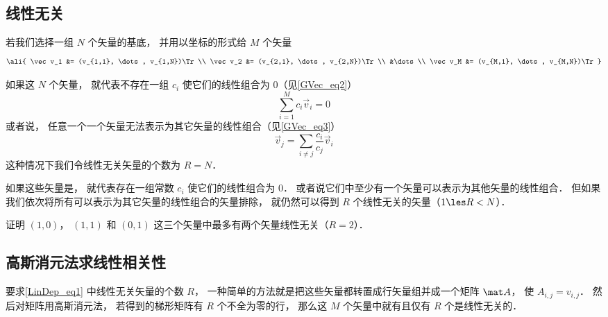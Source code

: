 

\subsection{线性无关}

若我们选择一组 $N$ 个矢量的基底， 并用以坐标的形式给 $M$ 个矢量
\begin{equation}\label{LinDep_eq1}
\ali{
\vec v_1 &= (v_{1,1}, \dots, v_{1,N})\Tr \\
\vec v_2 &= (v_{2,1}, \dots, v_{2,N})\Tr \\
&\dots \\
\vec v_M &= (v_{M,1}, \dots, v_{M,N})\Tr
}\end{equation}

如果这 $N$ 个矢量， 就代表不存在一组 $c_i$ 使它们的线性组合为 0（见\autoref{GVec_eq2}）
\begin{equation}
\sum_{i=1}^M c_i\vec v_i = 0
\end{equation}
或者说， 任意一个一个矢量无法表示为其它矢量的线性组合（见\autoref{GVec_eq3}）%
\begin{equation}
\vec v_j = \sum_{i \ne j}\frac{c_i}{c_j} \vec v_i
\end{equation}
这种情况下我们令线性无关矢量的个数为 $R = N$．

如果这些矢量是， 就代表存在一组常数 $c_i$ 使它们的线性组合为 0． 或者说它们中至少有一个矢量可以表示为其他矢量的线性组合． 但如果我们依次将所有可以表示为其它矢量的线性组合的矢量排除， 就仍然可以得到  $R$ 个线性无关的矢量（$1 \les R < N$）．

\begin{exer}{}
证明 $(1,0)$， $(1,1)$ 和 $(0,1)$ 这三个矢量中最多有两个矢量线性无关（$R = 2$）．
\end{exer}

\subsection{高斯消元法求线性相关性}
要求\autoref{LinDep_eq1} 中线性无关矢量的个数 $R$， 一种简单的方法就是把这些矢量都转置成行矢量组并成一个矩阵 $\mat A$， 使 $A_{i,j} = v_{i,j}$． 然后对矩阵用高斯消元法， 若得到的梯形矩阵有 $R$ 个不全为零的行， 那么这 $M$ 个矢量中就有且仅有 $R$ 个是线性无关的．





 